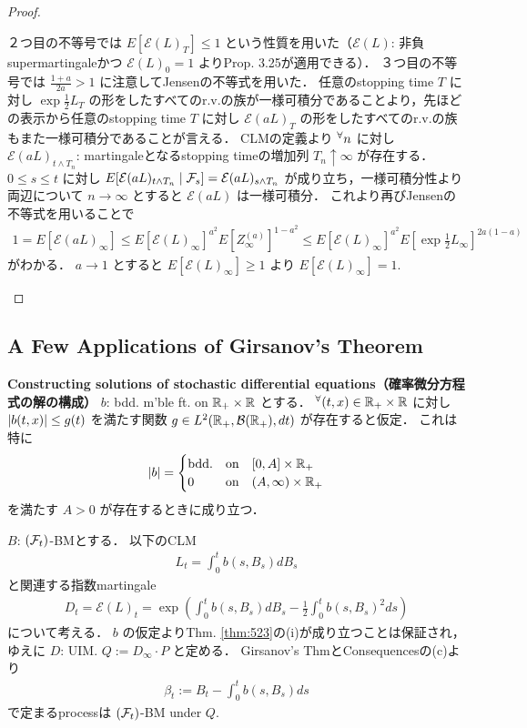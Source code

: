 \documentclass{jsarticle}
\begin{document}
\begin{proof}
\begin{description}
        ２つ目の不等号では $E[\mathcal{E}(L)_T]\le1$ という性質を用いた（$\mathcal{E}(L)$: 非負supermartingaleかつ $\mathcal{E}(L)_0=1$ よりProp. 3.25が適用できる）．
        ３つ目の不等号では $\frac{1+a}{2a}>1$ に注意してJensenの不等式を用いた．
        任意のstopping time $T$ に対し $\exp\frac{1}{2}L_T$ の形をしたすべてのr.v.の族が一様可積分であることより，先ほどの表示から任意のstopping time $T$ に対し $\mathcal{E}(aL)_T$ の形をしたすべてのr.v.の族もまた一様可積分であることが言える．
        CLMの定義より ${}^{\forall} n$ に対し $\mathcal{E}(aL)_{t\wedge T_n}$: martingaleとなるstopping timeの増加列 $T_n\uparrow\infty$ が存在する．
        $0\le s\le t$ に対し $E[\mathcal{E}(aL)_{t\wedge T_n}\mid\mathcal{F}_s]=\mathcal{E}(aL)_{s\wedge T_n}$ が成り立ち，一様可積分性より両辺について $n\to\infty$ とすると $\mathcal{E}(aL)$ は一様可積分．
        これより再びJensenの不等式を用いることで
        \begin{align}
            1=E[\mathcal{E}(aL)_{\infty}]
            \le E[\mathcal{E}(L)_\infty]^{a^2}
            E[Z_{\infty}^{(a)}]^{1-a^2}
            \le E[\mathcal{E}(L)_\infty]^{a^2}
            E[\exp\frac{1}{2}L_\infty]^{2a(1-a)}
        \end{align}
        がわかる．
        $a\to1$ とすると $E[\mathcal{E}(L)_\infty]\ge1$ より $E[\mathcal{E}(L)_\infty]=1.$
    \end{description}
\end{proof}


\subsection{A Few Applications of Girsanov's Theorem}

\textbf{Constructing solutions of stochastic differential equations（確率微分方程式の解の構成）}
$b$: bdd. m'ble ft. on $\mathbb{R}_+\times\mathbb{R}$ とする．
${}^{\forall} (t,x)\in\mathbb{R}_+\times\mathbb{R}$ に対し $\lvert b(t,x)\rvert\le g(t)$ を満たす関数 $g\in L^2(\mathbb{R}_+,\mathcal{B}(\mathbb{R}_+),dt)$ が存在すると仮定．
これは特に
\begin{align}
    \lvert b\rvert=
    \begin{cases}
        \text{bdd.} &\text{on}\quad [0,A]\times\mathbb{R}_+ \\
        0 &\text{on}\quad (A,\infty)\times\mathbb{R}_+
    \end{cases}
\end{align}
を満たす $A>0$ が存在するときに成り立つ．

$B$: $(\mathcal{F}_t)$-BMとする．
以下のCLM
\begin{align}
    L_t=\int_0^t b(s,B_s)dB_s
\end{align}
と関連する指数martingale
\begin{align}
    D_t
    = \mathcal{E}(L)_t
    = \exp\left(\int_0^t b(s,B_s)dB_s-\frac{1}{2}\int_0^t b(s,B_s)^2 ds\right)
\end{align}
について考える．
$b$ の仮定よりThm. \ref{thm:523}の(i)が成り立つことは保証され，ゆえに $D$: UIM.
$Q:=D_\infty\cdot P$ と定める．
Girsanov's ThmとConsequencesの(c)より
\begin{align}
    \beta_t:=B_t-\int_0^t b(s,B_s)ds
\end{align}
で定まるprocessは $(\mathcal{F}_t)$-BM under $Q.$
\end{document}
